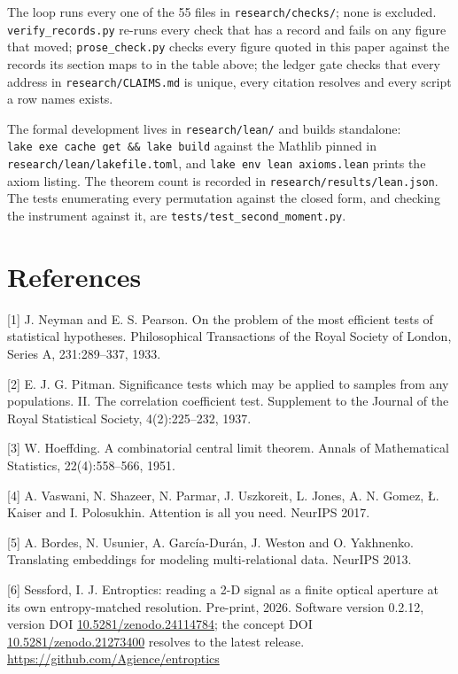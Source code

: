 \documentclass[10pt,letterpaper,twocolumn]{article}
\begin{document}
The loop runs every one of the 55 files in \texttt{research/\allowbreak{}checks/\allowbreak{}}; none is excluded.
\texttt{verify\_\allowbreak{}records.\allowbreak{}py} re-runs every check that has a record and fails on any figure that moved;
\texttt{prose\_\allowbreak{}check.\allowbreak{}py} checks every figure quoted in this paper against the records its section maps to in
the table above; the ledger gate checks that every address in \texttt{research/\allowbreak{}CLAIMS.\allowbreak{}md} is unique, every
citation resolves and every script a row names exists.

The formal development lives in \texttt{research/\allowbreak{}lean/\allowbreak{}} and builds standalone: \texttt{lake\ exe\ cache\ get\ \&\&\ lake\ build} against the Mathlib pinned in \texttt{research/\allowbreak{}lean/\allowbreak{}lakefile.\allowbreak{}toml}, and \texttt{lake\ env\ lean\ axioms.\allowbreak{}lean}
prints the axiom listing. The theorem count is recorded in \texttt{research/\allowbreak{}results/\allowbreak{}lean.\allowbreak{}json}. The tests
enumerating every permutation against the closed form, and checking the instrument against it, are
\texttt{tests/\allowbreak{}test\_\allowbreak{}second\_\allowbreak{}moment.\allowbreak{}py}.

\section{References}\label{references}

{[}1{]} J. Neyman and E. S. Pearson. On the problem of the most efficient tests of statistical
hypotheses. Philosophical Transactions of the Royal Society of London, Series A, 231:289--337, 1933.

{[}2{]} E. J. G. Pitman. Significance tests which may be applied to samples from any populations. II.
The correlation coefficient test. Supplement to the Journal of the Royal Statistical Society,
4(2):225--232, 1937.

{[}3{]} W. Hoeffding. A combinatorial central limit theorem. Annals of Mathematical Statistics,
22(4):558--566, 1951.

{[}4{]} A. Vaswani, N. Shazeer, N. Parmar, J. Uszkoreit, L. Jones, A. N. Gomez, Ł. Kaiser and
I. Polosukhin. Attention is all you need. NeurIPS 2017.

{[}5{]} A. Bordes, N. Usunier, A. García-Durán, J. Weston and O. Yakhnenko. Translating embeddings for
modeling multi-relational data. NeurIPS 2013.

{[}6{]} Sessford, I. J. Entroptics: reading a 2-D signal as a finite optical aperture at its own
entropy-matched resolution. Pre-print, 2026. Software version 0.2.12, version DOI
\href{https://doi.org/10.5281/zenodo.24114784}{10.5281/zenodo.24114784}; the concept DOI
\href{https://doi.org/10.5281/zenodo.21273400}{10.5281/zenodo.21273400} resolves to the latest release.
\href{https://github.com/Agience/entroptics}{https:\allowbreak{}/\allowbreak{}/\allowbreak{}github.\allowbreak{}com/\allowbreak{}Agience/\allowbreak{}entropti\allowbreak{}cs}
\end{document}
